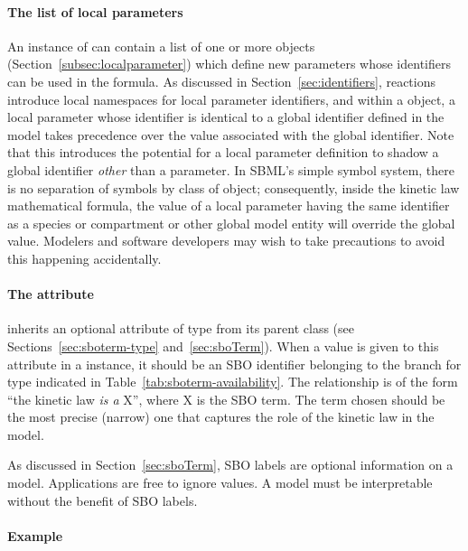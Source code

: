 \paragraph{The list of local parameters}

An instance of \KineticLaw can contain a list of
one or more \LocalParameter objects (Section~\ref{subsec:localparameter})
which define new parameters whose identifiers can be used in the
 formula.  As discussed in
Section~\ref{sec:identifiers}, reactions introduce local
namespaces for local parameter identifiers, and within a
\KineticLaw object, a local parameter whose identifier is
identical to a global identifier defined in the model takes
precedence over the value associated with
the global identifier.  Note that this introduces the potential
for a local parameter definition to shadow a global identifier
\emph{other} than a parameter.  In SBML's simple symbol system, 
there is no separation of symbols by class of object;
consequently,  inside the kinetic law mathematical
formula, the value of a local parameter having the same
identifier as a species or compartment or other global model
entity will override the global value.  Modelers and software
developers may wish to take precautions to avoid this happening
accidentally.


\paragraph{The  attribute}

\KineticLaw  inherits an optional 
attribute of type  from its parent
class \SBase (see Sections~\ref{sec:sboterm-type}
and~\ref{sec:sboTerm}).  When a value is given to this
attribute in a  \KineticLaw instance, it should be an
SBO identifier belonging to the branch for type  \KineticLaw
indicated in Table~\ref{tab:sboterm-availability}.  The relationship is
of the form ``the kinetic law \emph{is a} X'', where X is
the SBO term.  The term chosen should be the most precise (narrow)
one that captures the role of the kinetic law in the model.

As discussed in Section~\ref{sec:sboTerm}, SBO labels are optional
information on a model.  Applications are free to ignore
 values.  A model must be interpretable without the
benefit of SBO labels.

\paragraph{Example}

